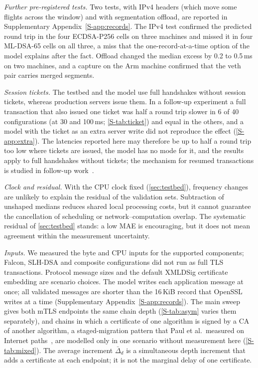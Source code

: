 \documentclass[preprint,12pt]{elsarticle}
\newcommand{\ms}{\,ms\xspace}
\begin{document}
\emph{Further pre-registered tests.} Two tests, with IPv4 headers (which move some flights across the window) and with segmentation offload, are reported in Supplementary Appendix~\ref{S-app:records}. The IPv4 test confirmed the predicted round trip in the four ECDSA-P256 cells on three machines and missed it in four ML-DSA-65 cells on all three, a miss that the one-record-at-a-time option of the model explains after the fact. Offload changed the median excess by 0.2 to 0.5\ms on two machines, and a capture on the Arm machine confirmed that the veth pair carries merged segments.

\emph{Session tickets.} The testbed and the model use full handshakes without session tickets, whereas production servers issue them. In a follow-up experiment a full transaction that also issued one ticket was half a round trip slower in 6 of 40 configurations (at 30 and 100\ms; \cref{S-tab:ticket}) and equal in the others, and a model with the ticket as an extra server write did not reproduce the effect (\cref{S-app:extra}). The latencies reported here may therefore be up to half a round trip too low where tickets are issued, the model has no mode for it, and the results apply to full handshakes without tickets; the mechanism for resumed transactions is studied in follow-up work~\cite{dinh2026artifact}.

\emph{Clock and residual.} With the CPU clock fixed (\cref{sec:testbed}), frequency changes are unlikely to explain the residual of the validation sets. Subtraction of unshaped medians reduces shared local processing costs, but it cannot guarantee the cancellation of scheduling or network--computation overlap. The systematic residual of \cref{sec:testbed} stands: a low MAE is encouraging, but it does not mean agreement within the measurement uncertainty.

\emph{Inputs.} We measured the byte and CPU inputs for the supported components; Falcon, SLH-DSA and composite configurations did not run as full TLS transactions. Protocol message sizes and the default XMLDSig certificate embedding are scenario choices. The model writes each application message at once; all validated messages are shorter than the 16\,KiB record that OpenSSL writes at a time (Supplementary Appendix~\ref{S-app:records}). The main sweep gives both mTLS endpoints the same chain depth (\cref{S-tab:asym} varies them separately), and chains in which a certificate of one algorithm is signed by a CA of another algorithm, a staged-migration pattern that Paul et al.\ measured on Internet paths~\cite{paul2022}, are modelled only in one scenario without measurement here (\cref{S-tab:mixed}). The average increment $\bar{\Delta}_d$ is a simultaneous depth increment that adds a certificate at each endpoint; it is not the marginal delay of one certificate.
\end{document}
